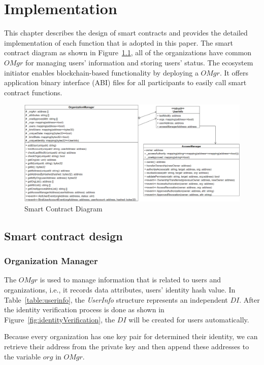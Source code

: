 \chapter{Implementation} 
\label{chapter:implementation}
This chapter describes the design of smart contracts and provides the detailed implementation of each function that is adopted in this paper. The smart contract diagram as shown in Figure~\ref{fig:smart_contract_diagram},  all of the organizations have common \(OMgr\) for managing users' information and storing users' status. The ecosystem initiator enables blockchain-based functionality by deploying a \(OMgr\). It offers application binary interface (ABI) files for all participants to easily call smart contract functions.

\begin{figure}[hb]
    \centering
    \includegraphics[height=!,width=1\linewidth,keepaspectratio=true]{figures/smart_contract_diagram.png}
    \caption{{\footnotesize Smart Contract Diagram}}
    \label{fig:smart_contract_diagram}
\end{figure}
\section{Smart contract design}
\subsection*{Organization Manager}
The \(OMgr\) is used to manage information that is related to users and organizations, i.e., it records data attributes, users' identity hash value. In Table~\ref{table:userinfo}, the \textit{UserInfo} structure represents an independent \(DI\). After the identity verification process is done as shown in Figure~\ref{fig:identityVerification}, the \(DI\) will be created for users automatically.\par
Because every organization has one key pair for determined their identity, we can retrieve their address from the private key and then append these addresses to the variable \(org\) in \(OMgr\).\par

